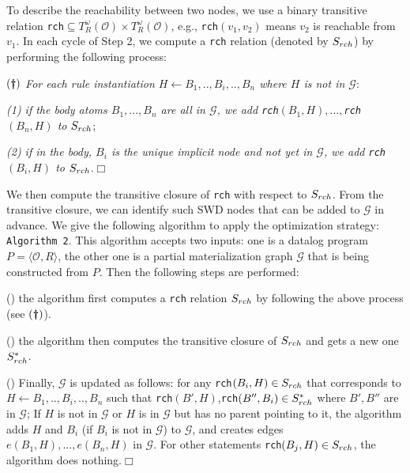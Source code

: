 \documentclass{article}
\begin{document}
To describe the reachability between two nodes, we use a
binary transitive relation \texttt{rch}$\subseteq T_R^{\omega}(\mathcal{O})\times T_R^{\omega}(\mathcal{O})$, e.g.,
\texttt{rch}$(v_1,v_2)$ means $v_2$ is reachable from $v_1$. In each cycle of Step 2, we compute a \texttt{rch}
relation (denoted by $S_{\tiny rch}$) by performing the following process:

$(\textbf{\dag})$ \emph{For each rule instantiation $H\leftarrow B_1,..,B_i,..,B_n$ where $H$ is not in $\mathcal{G}$}:

\emph{(1) if the body atoms $B_1,...,B_n$ are all in $\mathcal{G}$, we add \texttt{rch}$(B_1,H),...,$\texttt{rch}$(B_n,H)$ to $S_{\tiny rch}$};

\emph{(2) if in the body, $B_i$ is the unique implicit node and not yet in $\mathcal{G}$, we add \texttt{rch}$(B_i,H)$ to $S_{\tiny rch}$}.\hfill$\Box$

We then compute the transitive closure of \texttt{rch} with respect to $S_{\tiny rch}$. From the transitive closure, we can identify such SWD nodes that can be added to $\mathcal{G}$ in advance. We give the following algorithm to apply the optimization strategy:\\

\noindent\texttt{Algorithm 2}. This algorithm accepts two inputs: one is a datalog program $P=\langle\mathcal{O}, R\rangle$, the other one is a partial materialization graph $\mathcal{G}$ that is being constructed from $P$. Then the following steps are performed:

(\textbf{}) the algorithm first computes a \texttt{rch} relation $S_{\tiny rch}$ by following the above process (see $(\textbf{\dag})$).

(\textbf{}) the algorithm then computes the transitive closure of $S_{\tiny rch}$ and gets a new one $S^*_{\tiny rch}$.

(\textbf{}) Finally, $\mathcal{G}$ is updated as follows: for any \texttt{rch}$(B_i,H)\in S_{\tiny rch}$ that corresponds to $H\leftarrow B_1,..,B_i,..,B_n$
such that \texttt{rch}$(B',H)$,\texttt{rch}$(B'',B_i)\in S^*_{\tiny rch}$ where $B',B''$ are in $\mathcal{G}$; If $H$ is not in $\mathcal{G}$ or $H$ is in $\mathcal{G}$ but has no parent pointing to it, the algorithm adds $H$ and $B_i$ (if $B_i$ is not in $\mathcal{G}$) to $\mathcal{G}$, and creates edges $e(B_1, H),...,e(B_n, H)$ in $\mathcal{G}$. For other statements \texttt{rch}$(B_j,H)\in S_{\tiny rch}$, the algorithm does nothing.\hfill$\Box$\\
\end{document}
